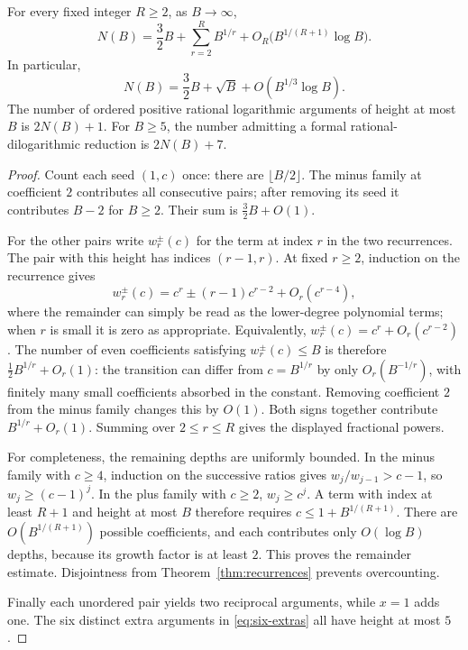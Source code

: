 \begin{theorem}\label{thm:counting}
For every fixed integer $R\ge2$, as $B\to\infty$,
\begin{equation}\label{eq:count-expansion}
 N(B)=\frac32 B+\sum_{r=2}^{R}B^{1/r}
       +O_R\bigl(B^{1/(R+1)}\log B\bigr).
\end{equation}
In particular,
\begin{equation}\label{eq:count-two}
 N(B)=\frac32 B+\sqrt B+O(B^{1/3}\log B).
\end{equation}
The number of ordered positive rational logarithmic arguments of height
at most $B$ is $2N(B)+1$. For $B\ge5$, the number admitting a formal
rational-dilogarithmic reduction is $2N(B)+7$.
\end{theorem}
\begin{proof}
Count each seed $(1,c)$ once: there are $\lfloor B/2\rfloor$.
The minus family at coefficient $2$ contributes all consecutive pairs;
after removing its seed it contributes $B-2$ for $B\ge2$. Their sum
is $\tfrac32B+O(1)$.

For the other pairs write $w_r^{\pm}(c)$ for the term at index $r$ in
the two recurrences. The pair with this height has indices $(r-1,r)$.
At fixed $r\ge2$, induction on the recurrence gives
\[
 w_r^{\pm}(c)=c^r\pm(r-1)c^{r-2}+O_r(c^{r-4}),
\]
where the remainder can simply be read as the lower-degree polynomial
terms; when $r$ is small it is zero as appropriate. Equivalently,
$w_r^{\pm}(c)=c^r+O_r(c^{r-2})$. The number of even coefficients
satisfying $w_r^{\pm}(c)\le B$ is therefore
$\tfrac12 B^{1/r}+O_r(1)$: the transition can differ from
$c=B^{1/r}$ by only $O_r(B^{-1/r})$, with finitely many small
coefficients absorbed in the constant. Removing coefficient $2$ from
the minus family changes this by $O(1)$. Both signs together contribute
$B^{1/r}+O_r(1)$. Summing over $2\le r\le R$ gives the displayed
fractional powers.

For completeness, the remaining depths are uniformly bounded. In the
minus family with $c\ge4$, induction on the successive ratios gives
$w_j/w_{j-1}>c-1$, so $w_j\ge(c-1)^j$. In the plus family with
$c\ge2$, $w_j\ge c^j$. A term with index at least $R+1$ and height
at most $B$ therefore requires
$c\le 1+B^{1/(R+1)}$. There are
$O(B^{1/(R+1)})$ possible coefficients, and each contributes only
$O(\log B)$ depths, because its growth factor is at least $2$.
This proves the remainder estimate. Disjointness from
Theorem~\ref{thm:recurrences} prevents overcounting.

Finally each unordered pair yields two reciprocal arguments, while
$x=1$ adds one. The six distinct extra arguments in
\eqref{eq:six-extras} all have height at most $5$.
\end{proof}

